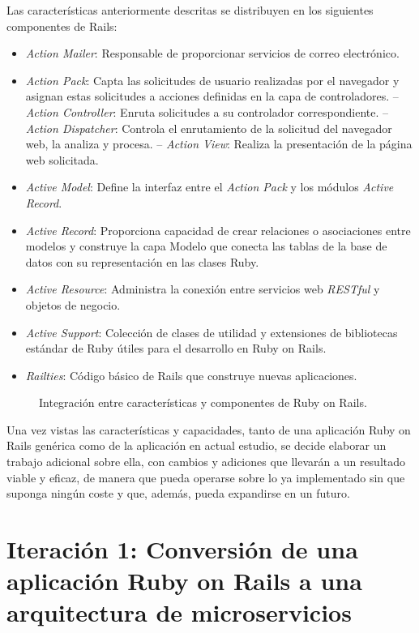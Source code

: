 Las características anteriormente descritas se distribuyen en los siguientes componentes de Rails:
\begin{itemize}
\item \textit{Action Mailer}: Responsable de proporcionar servicios de correo electrónico. 
\item \textit{Action Pack}: Capta las solicitudes de usuario realizadas por el navegador y asignan estas solicitudes a acciones definidas en la capa de controladores.
\subitem-- \textit{Action Controller}: Enruta solicitudes a su controlador correspondiente. 
\subitem-- \textit{Action Dispatcher}: Controla el enrutamiento de la solicitud del navegador web, la analiza y procesa.
\subitem-- \textit{Action View}: Realiza la presentación de la página web solicitada.
\item \textit{Active Model}: Define la interfaz entre el \textit{Action Pack} y los módulos \textit{Active Record}.
\item \textit{Active Record}: Proporciona capacidad de crear relaciones o asociaciones entre modelos y construye la capa Modelo que conecta las tablas de la base de datos con su representación en las clases Ruby.
\item \textit{Active Resource}: Administra la conexión entre servicios web \textit{RESTful} y objetos de negocio.
\item \textit{Active Support}: Colección de clases de utilidad y extensiones de bibliotecas estándar de Ruby útiles para el desarrollo en Ruby on Rails.
\item \textit{Railties}: Código básico de Rails que construye nuevas aplicaciones. \end{itemize}	 

\begin{figure}[H]
\caption{Integración entre características y componentes de Ruby on Rails.\label{fig:figure_placement_example}}
\end{figure}

Una vez vistas las características y capacidades, tanto de una aplicación Ruby on Rails genérica como de la aplicación en actual estudio, se decide elaborar un trabajo adicional sobre ella, con cambios y adiciones que llevarán a un resultado viable y eficaz, de manera que pueda  operarse sobre lo ya implementado sin que suponga ningún coste y que, además, pueda expandirse en un futuro.

\section{Iteración 1: Conversión de una aplicación Ruby on Rails a una arquitectura de microservicios}

